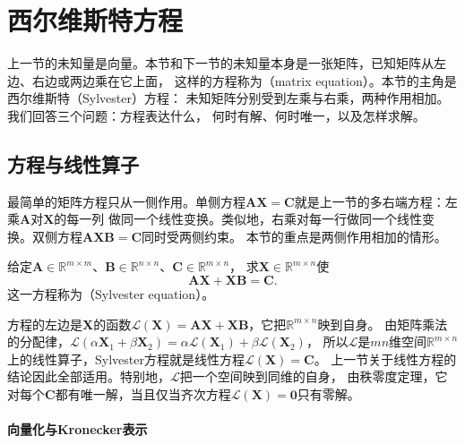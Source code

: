 
\section{西尔维斯特方程}
\label{sec:ls-matrix-equations}
\label{sec:linear-algebra-matrix-equations}

上一节的未知量是向量。本节和下一节的未知量本身是一张矩阵，已知矩阵从左边、右边或两边乘在它上面，
这样的方程称为（matrix equation）。本节的主角是西尔维斯特（Sylvester）方程：
未知矩阵分别受到左乘与右乘，两种作用相加。我们回答三个问题：方程表达什么，
何时有解、何时唯一，以及怎样求解。

\subsection{方程与线性算子}
\label{sec:ls-matrix-equation-types}

最简单的矩阵方程只从一侧作用。单侧方程$\bm A\bm X=\bm C$就是上一节的多右端方程：左乘$\bm A$对$\bm X$的每一列
做同一个线性变换。类似地，右乘对每一行做同一个线性变换。双侧方程$\bm A\bm X\bm B=\bm C$同时受两侧约束。
本节的重点是两侧作用相加的情形。

\begin{definition}[Sylvester方程]
\label{def:matrix-analysis-sylvester-equation}
给定$\bm A\in\mathbb R^{m\times m}$、$\bm B\in\mathbb R^{n\times n}$、$\bm C\in\mathbb R^{m\times n}$，
求$\bm X\in\mathbb R^{m\times n}$使
\[
 \bm A\bm X+\bm X\bm B=\bm C .
\]
这一方程称为（Sylvester equation）。
\end{definition}

方程的左边是$\bm X$的函数$\mathcal L(\bm X)=\bm A\bm X+\bm X\bm B$，它把$\mathbb R^{m\times n}$映到自身。
由矩阵乘法的分配律，$\mathcal L(\alpha\bm X_1+\beta\bm X_2)=\alpha\mathcal L(\bm X_1)+\beta\mathcal L(\bm X_2)$，
所以$\mathcal L$是$mn$维空间$\mathbb R^{m\times n}$上的线性算子，Sylvester方程就是线性方程$\mathcal L(\bm X)=\bm C$。
上一节关于线性方程的结论因此全部适用。特别地，$\mathcal L$把一个空间映到同维的自身，
由秩零度定理，它对每个$\bm C$都有唯一解，当且仅当齐次方程$\mathcal L(\bm X)=\bm0$只有零解。

\paragraph{向量化与Kronecker表示}

